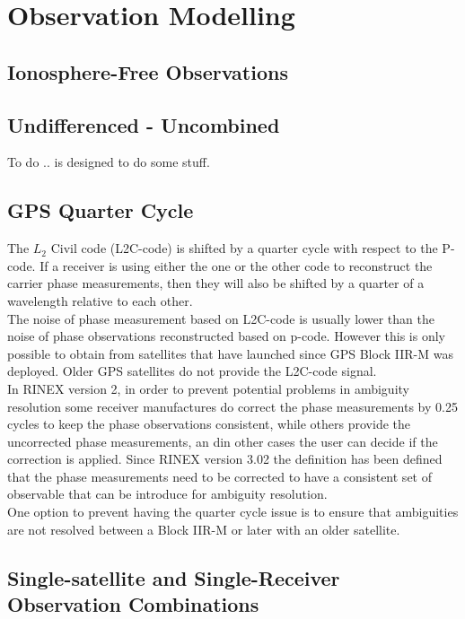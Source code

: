\chapter{Observation Modelling}
\label{ch:observation_modelling}

\section{Ionosphere-Free Observations}

\section{Undifferenced - Uncombined}
To do ..
 is designed to do some stuff.

\section{GPS Quarter Cycle}
\begin{fullwidth}
The $L_2$ Civil code (L2C-code) is shifted by a quarter cycle with respect to the P-code. If a receiver is using either the one or the other code to reconstruct the carrier phase measurements, then they will also be shifted by a quarter of a wavelength relative to each other.\\
The noise of phase measurement based on L2C-code is usually lower than the noise of phase observations reconstructed based on p-code. However this is only possible to obtain from satellites that have launched since GPS Block IIR-M was deployed. Older GPS satellites do not provide the L2C-code signal.\\
In RINEX version 2, in order to prevent potential problems in ambiguity resolution some receiver manufactures do correct the phase measurements by 0.25 cycles to keep the phase observations consistent, while others provide the uncorrected phase measurements, an din other cases the user can decide if the correction is applied. Since RINEX version 3.02 the definition has been defined that the phase measurements need to be corrected to have a consistent set of observable that can be introduce for ambiguity resolution.\\
One option to prevent having the quarter cycle issue is to ensure that ambiguities are not resolved between a Block IIR-M or later  with an older satellite.
\end{fullwidth}

\section{Single-satellite and Single-Receiver Observation Combinations}

